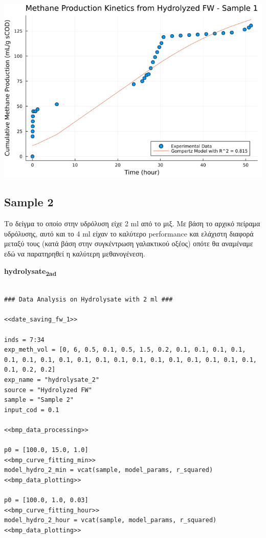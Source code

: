 \documentclass[11pt]{article}
\begin{document}
\begin{center}
\includegraphics[width=.9\linewidth]{../plots/BMPs/Hydrolyzed FW/methane_kinetics_hydrolysate_1_hour.png}
\end{center}

\subsection{Sample 2}
\label{sec:org9f206ab}
Το δείγμα το οποίο στην υδρόλυση είχε 2 ml από το μιξ. Με βάση το αρχικό πείραμα υδρόλυσης, αυτό και το 4 ml είχαν το καλύτερο performance και ελάχιστη διαφορά μεταξύ τους (κατά βάση στην συγκέντρωση γαλακτικού οξέος) οπότε θα αναμέναμε εδώ να παρατηρηθεί η καλύτερη μεθανογένεση.

\textbf{hydrolysate\textsubscript{2}\textsubscript{ad}}
\begin{verbatim}

### Data Analysis on Hydrolysate with 2 ml ###

<<date_saving_fw_1>>

inds = 7:34
exp_meth_vol = [0, 6, 0.5, 0.1, 0.5, 1.5, 0.2, 0.1, 0.1, 0.1, 0.1, 0.1, 0.1, 0.1, 0.1, 0.1, 0.1, 0.1, 0.1, 0.1, 0.1, 0.1, 0.1, 0.1, 0.1, 0.1, 0.2, 0.2]
exp_name = "hydrolysate_2"
source = "Hydrolyzed FW"
sample = "Sample 2"
input_cod = 0.1

<<bmp_data_processing>>

p0 = [100.0, 15.0, 1.0]
<<bmp_curve_fitting_min>>
model_hydro_2_min = vcat(sample, model_params, r_squared)
<<bmp_data_plotting>>

p0 = [100.0, 1.0, 0.03]
<<bmp_curve_fitting_hour>>
model_hydro_2_hour = vcat(sample, model_params, r_squared)
<<bmp_data_plotting>>
\end{verbatim}
\end{document}
